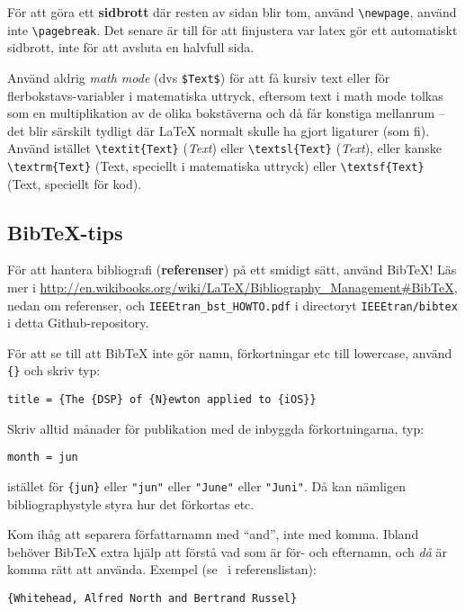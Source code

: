 För att göra ett \textbf{sidbrott} där resten av sidan blir tom, använd \verb|\newpage|, använd inte \verb|\pagebreak|. Det senare är till för att finjustera var latex gör ett automatiskt sidbrott, inte för att avsluta en halvfull sida.

Använd aldrig \textit{math mode} (dvs \verb|$Text$|) för att få kursiv text eller för flerbokstavs-variabler i matematiska uttryck, eftersom text i math mode tolkas som en multiplikation av de olika bokstäverna och då får konstiga mellanrum -- det blir särskilt tydligt där La\TeX{} normalt skulle ha gjort ligaturer (som fi). Använd istället \verb|\textit{Text}| (\textit{Text}) eller \verb|\textsl{Text}| (\textsl{Text}), eller kanske \verb|\textrm{Text}| (\textrm{Text}, speciellt i matematiska uttryck) eller \verb|\textsf{Text}| (\textsf{Text}, speciellt för kod).

\subsection{Bib\TeX-tips}

För att hantera bibliografi (\textbf{referenser}) på ett smidigt sätt, använd BibTeX! Läs mer i \url{http://en.wikibooks.org/wiki/LaTeX/Bibliography_Management#BibTeX}, nedan om referenser, och
\texttt{IEEEtran\_bst\_HOWTO.pdf} i directoryt \texttt{IEEEtran/bibtex} i detta Github-repository.

För att se till att BibTeX inte gör namn, förkortningar etc till lowercase, använd \verb|{}| och skriv typ:
\begin{verbatim}
title = {The {DSP} of {N}ewton applied to {iOS}}
\end{verbatim}

Skriv alltid månader för publikation med de inbyggda förkortningarna, typ:
\begin{verbatim}
month = jun
\end{verbatim}
istället för \verb|{jun}| eller \verb|"jun"| eller \verb|"June"| eller \verb|"Juni"|. Då kan nämligen bibliographystyle styra hur det förkortas etc.

Kom ihåg att separera författarnamn med ``and'', inte med komma. Ibland behöver Bib\TeX{} extra hjälp att förstå vad som är för- och efternamn, och \emph{då} är komma rätt att använda. Exempel (se~\cite{whitehead.russel:principia-mathematica} i referenslistan):
\begin{verbatim}
{Whitehead, Alfred North and Bertrand Russel}
\end{verbatim}

